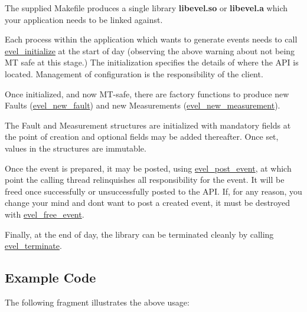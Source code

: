 The supplied Makefile produces a single library {\bfseries libevel.\+so} or {\bfseries libevel.\+a} which your application needs to be linked against.

Each process within the application which wants to generate events needs to call \hyperlink{evel_8h_aff020c5505e724b414ac981e2a23fcd6}{evel\+\_\+initialize} at the start of day (observing the above warning about not being M\+T safe at this stage.) The initialization specifies the details of where the A\+P\+I is located. Management of configuration is the responsibility of the client.

Once initialized, and now M\+T-\/safe, there are factory functions to produce new Faults (\hyperlink{evel__fault_8c_ae31203fde9153686a32b2fc2a1183fa0}{evel\+\_\+new\+\_\+fault}) and new Measurements (\hyperlink{evel__scaling__measurement_8c_a162ce37ab7f24dbbea23d46b77c974ce}{evel\+\_\+new\+\_\+measurement}).

The Fault and Measurement structures are initialized with mandatory fields at the point of creation and optional fields may be added thereafter. Once set, values in the structures are immutable.

Once the event is prepared, it may be posted, using \hyperlink{evel__event__mgr_8c_a209d2e5dbffe9e11ac79ae140f4a81bd}{evel\+\_\+post\+\_\+event}, at which point the calling thread relinquishes all responsibility for the event. It will be freed once successfully or unsuccessfully posted to the A\+P\+I. If, for any reason, you change your mind and don\textquotesingle{}t want to post a created event, it must be destroyed with \hyperlink{evel_8h_a91faa4e06c4b079c2a8a1db1ccb2e47b}{evel\+\_\+free\+\_\+event}.

Finally, at the end of day, the library can be terminated cleanly by calling \hyperlink{evel_8h_ab3f6225ddb9c5113d74503d4fcd17e5b}{evel\+\_\+terminate}.

\subsection*{Example Code}

The following fragment illustrates the above usage\+:


